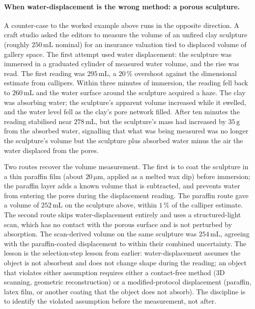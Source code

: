 \paragraph{When water-displacement is the wrong method: a porous
sculpture.}
A counter-case to the worked example above runs in the opposite
direction. A craft studio asked the editors to measure the volume
of an unfired clay sculpture (roughly $250 \,\si{\milli\liter}$
nominal) for an insurance valuation tied to displaced volume of
gallery space. The first attempt used water displacement: the
sculpture was immersed in a graduated cylinder of measured water
volume, and the rise was read. The first reading was $295 \,\si
{\milli\liter}$, a $20\,\%$ overshoot against the dimensional
estimate from callipers. Within three minutes of immersion, the
reading fell back to $260 \,\si{\milli\liter}$ and the water
surface around the sculpture acquired a haze. The clay was
absorbing water; the sculpture's apparent volume increased while it
swelled, and the water level fell as the clay's pore network filled.
After ten minutes the reading stabilised near $278 \,\si{\milli
\liter}$, but the sculpture's mass had increased by $35 \,\si{\gram}$
from the absorbed water, signalling that what was being measured
was no longer the sculpture's volume but the sculpture plus absorbed
water minus the air the water displaced from the pores.

Two routes recover the volume measurement. The first is to coat
the sculpture in a thin paraffin film (about $20 \,\si{\micro\meter}$,
applied as a melted wax dip) before immersion; the paraffin layer
adds a known volume that is subtracted, and prevents water from
entering the pores during the displacement reading. The paraffin
route gave a volume of $252 \,\si{\milli\liter}$ on the sculpture
above, within $1\,\%$ of the calliper estimate. The second route
skips water-displacement entirely and uses a structured-light scan,
which has no contact with the porous surface and is not perturbed
by absorption. The scan-derived volume on the same sculpture was
$254 \,\si{\milli\liter}$, agreeing with the paraffin-coated
displacement to within their combined uncertainty. The lesson is
the selection-step lesson from earlier: water-displacement assumes
the object is not absorbent and does not change shape during the
reading; an object that violates either assumption requires either
a contact-free method (3D scanning, geometric reconstruction) or a
modified-protocol displacement (paraffin, latex film, or another
coating that the object does not absorb). The discipline is to
identify the violated assumption before the measurement, not after.

